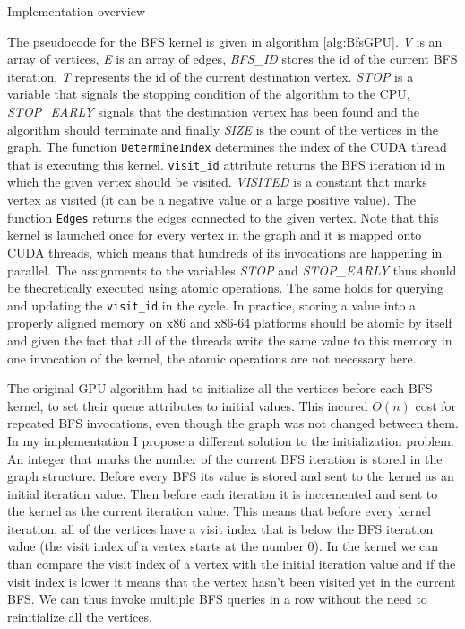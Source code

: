 \documentclass[a4paper,12pt,notitlepage,oneside]{article}
\newcommand{\parspace}[1][]{
	\ifthenelse{\isempty{#1}}{\vspace{5mm}}{\vspace{#1}}
	\par
}
\begin{document}
\begin{section}{Implementation overview}
\parspace The pseudocode for the BFS kernel is given in algorithm \ref{alg:BfsGPU}. \textit{V} is an array of vertices, \textit{E} is an array of edges,
\textit{BFS\_ID} stores the id of the current BFS iteration, \textit{T} represents the id of the current destination vertex. \textit{STOP} is a variable that signals
the stopping condition of the algorithm to the CPU, \textit{STOP\_EARLY} signals that the destination vertex has been found and the algorithm should terminate
and finally \textit{SIZE} is the count of the vertices in the graph. The function \texttt{DetermineIndex} determines the index of the CUDA thread that is
executing this kernel. \texttt{visit\_id} attribute returns the BFS iteration id in which the given vertex should be visited. \textit{VISITED} is a constant
that marks vertex as visited (it can be a negative value or a large positive value). The function \texttt{Edges} returns the edges connected to the given
vertex. Note that this kernel is launched once for every vertex in the graph and it is mapped onto CUDA threads, which means that hundreds of its invocations
are happening in parallel. The assignments to the variables \textit{STOP} and \textit{STOP\_EARLY} thus should be theoretically executed using atomic operations.
The same holds for querying and updating the \texttt{visit\_id} in the cycle. In practice, storing a value into a properly aligned memory on x86 and x86-64
platforms should be atomic by itself and given the fact that all of the threads write the same value to this memory in one invocation of the kernel, the
atomic operations are not necessary here.

\parspace The original GPU algorithm had to initialize all the vertices before each BFS kernel, to set their queue attributes to initial values.
This incured \(O(n)\) cost for repeated BFS invocations, even though the graph was not changed between them. In my implementation I propose a different solution
to the initialization problem. An integer that marks the number of the current BFS iteration is stored in the graph structure. Before every BFS its value is stored
and sent to the kernel as an initial iteration value. Then before each iteration it is incremented and sent to the kernel as the current iteration value. This means
that before every kernel iteration, all of the vertices have a visit index that is below the BFS iteration value (the visit index of a vertex starts at the
number \(0\)). In the kernel we can than compare the visit index of a vertex with the initial iteration value and if the visit index is lower it means that
the vertex hasn't been visited yet in the current BFS. We can thus invoke multiple BFS queries in a row without the need to reinitialize all the vertices.



\end{section}
\end{document}
